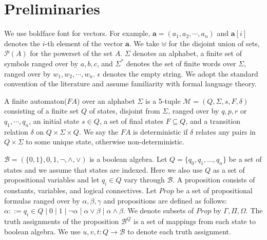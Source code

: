 \section{Preliminaries}

We use boldface font for vectors. For example, \( \mathbf{a} = (a_1, a_2,
\cdots, a_n) \) and \( \mathbf{a}[i] \) denotes the \( i \)-th element of the
vector \( \mathbf{a} \). We take \( \uplus \) for the disjoint union of sets, \(
\mathcal{P}(A) \) for the powerset of the set \( A \). \( \Sigma \) denotes an
alphabet, a finite set of symbols ranged over by \( a, b, c \), and \( \Sigma^*
\) denotes the set of finite words over \( \Sigma \), ranged over by \( w_1,
w_2, \cdots, w_n \). \( \epsilon \) denotes the empty string. We adopt the
standard convention of the literature\cite{Thomas:1997,tata2007} and assume
familiarity with formal language theory\cite{Kozen:1997}.

A finite automaton(\( \mathit{FA} \)) over an alphabet \( \Sigma \) is a 5-tuple
\( \mathcal{M} = (Q, \Sigma, s, F, \delta) \) consisting of a finite set \( Q \)
of states, disjoint from \( \Sigma \), ranged over by \( q, p, r \) or \( q_1,
\cdots , q_n \), an initial state \( s \in Q \), a set of final states \( F
\subseteq Q \), and a transition relation \( \delta \) on \( Q \times \Sigma
\times Q \). We say the \(\mathit{FA}\) is deterministic if \( \delta \) relates
any pairs in \( Q \times \Sigma \) to some unique state, otherwise
non-deterministic.

\( \mathcal{B} = (\{0, 1\}, 0, 1, \neg, \wedge, \vee) \) is a boolean
algebra. Let \( Q = \{ q_0, q_1, ..., q_n \} \) be a set of states and we assume
that states are indexed. Here we also use \( Q \) as a set of propositional
variables and let \( q_i \in Q \) vary through \( \mathcal{B} \). A proposition
consists of constants, variables, and logical connectives. Let \( \mathit{Prop}
\) be a set of propositional formulas ranged over by \( \alpha, \beta, \gamma \)
and propositions are defined as follows: \(\alpha ::= q_i \in Q \mid 0 \mid 1
\mid \neg \alpha \mid \alpha \vee \beta \mid \alpha \wedge \beta\). We denote
subsets of \( \mathit{Prop} \) by \( \Gamma, \Pi, \Omega \). The truth
assignments of the proposition \(\mathcal{B}^Q\) is a set of mappings from each
state to boolean algebra. We use \( u, v, t : Q \rightarrow \mathcal{B} \) to
denote each truth assignment.

